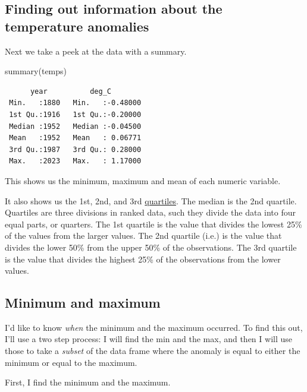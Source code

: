 \documentclass[
  letterpaper,
  DIV=11,
  numbers=noendperiod]{scrreprt}
\newenvironment{Shaded}{\begin{snugshade}}{\end{snugshade}}
\newcommand{\DocumentationTok}[1]{\textcolor[rgb]{0.37,0.37,0.37}{\textit{#1}}}
\newcommand{\FunctionTok}[1]{\textcolor[rgb]{0.28,0.35,0.67}{#1}}
\newcommand{\NormalTok}[1]{\textcolor[rgb]{0.00,0.23,0.31}{#1}}
\newcommand{\OtherTok}[1]{\textcolor[rgb]{0.00,0.23,0.31}{#1}}
\newcommand{\SpecialCharTok}[1]{\textcolor[rgb]{0.37,0.37,0.37}{#1}}
\begin{document}
\subsection{Finding out information about the temperature
anomalies}\label{finding-out-information-about-the-temperature-anomalies}

Next we take a peek at the data with a summary.

\begin{Shaded}
\begin{Highlighting}[]
\FunctionTok{summary}\NormalTok{(temps)}
\end{Highlighting}
\end{Shaded}

\begin{verbatim}
      year          deg_C         
 Min.   :1880   Min.   :-0.48000  
 1st Qu.:1916   1st Qu.:-0.20000  
 Median :1952   Median :-0.04500  
 Mean   :1952   Mean   : 0.06771  
 3rd Qu.:1987   3rd Qu.: 0.28000  
 Max.   :2023   Max.   : 1.17000  
\end{verbatim}

This shows us the minimum, maximum and mean of each numeric variable.

It also shows us the 1st, 2nd, and 3rd
\href{https://en.wikipedia.org/wiki/Quartile}{quartiles}. The median is
the 2nd quartile. Quartiles are three divisions in ranked data, such
they divide the data into four equal parts, or quarters. The 1st
quartile is the value that divides the lowest 25\% of the values from
the larger values. The 2nd quartile (i.e.) is the value that divides the
lower 50\% from the upper 50\% of the observations. The 3rd quartile is
the value that divides the highest 25\% of the observations from the
lower values.

\subsection{Minimum and maximum}\label{minimum-and-maximum}

I'd like to know \emph{when} the minimum and the maximum occurred. To
find this out, I'll use a two step process: I will find the min and the
max, and then I will use those to take a \emph{subset} of the data frame
where the anomaly is equal to either the minimum or equal to the
maximum.

First, I find the minimum and the maximum.

\begin{Shaded}
\end{Shaded}
\end{document}

